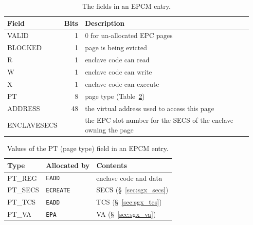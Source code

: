 
\begin{table}[hbt]
  \centering
  \begin{tabularx}{\columnwidth}{| l | r | X |}
  \hline
  \textbf{Field} & \textbf{Bits} & \textbf{Description}\\
  \hline
  VALID & 1 & 0 for un-allocated EPC pages \\
  \hline
  BLOCKED & 1 & page is being evicted \\
  \hline
  R & 1 & enclave code can read \\
  \hline
  W & 1 & enclave code can write \\
  \hline
  X & 1 & enclave code can execute \\
  \hline
  PT & 8 & page type (Table~\ref{fig:sgx_pt_values}) \\
  \hline
  ADDRESS & 48 & the virtual address used to access this page \\
  \hline
  ENCLAVESECS &  & the EPC slot number for the SECS of the enclave owning the
                     page \\
  \hline
  \end{tabularx}
  \caption{
    The fields in an EPCM entry.
  }
  \label{fig:sgx_epcm_entry}
\end{table}

\begin{table}[hbt]
  \centering
  \begin{tabularx}{\columnwidth}{| l | l | X |}
  \hline
  \textbf{Type} & \textbf{Allocated by} & \textbf{Contents}\\
  \hline
  PT\_REG & \texttt{EADD} & enclave code and data \\
  \hline
  PT\_SECS & \texttt{ECREATE} & SECS (\S~\ref{sec:sgx_secs}) \\
  \hline
  PT\_TCS & \texttt{EADD} & TCS (\S~\ref{sec:sgx_tcs}) \\
  \hline
  PT\_VA & \texttt{EPA} & VA (\S~\ref{sec:sgx_va}) \\
  \hline
  \end{tabularx}
  \caption{Values of the PT (page type) field in an EPCM entry.}
  \label{fig:sgx_pt_values}
\end{table}


